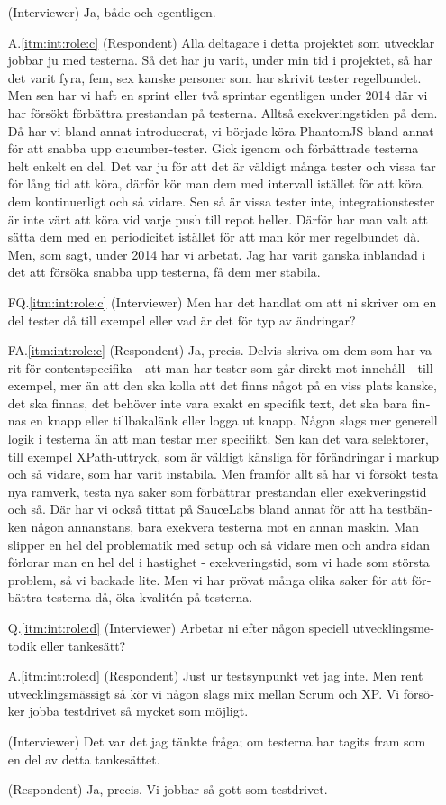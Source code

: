 \begin{otherlanguage}{swedish}
\begin{itemize}
  \item[] (Interviewer) Ja, både och egentligen.
  \item[A.\ref{itm:int:role:c}] (Respondent) Alla deltagare i detta projektet som utvecklar jobbar ju med testerna. Så det har ju varit, under min tid i projektet, så har det varit fyra, fem, sex kanske personer som har skrivit tester regelbundet. Men sen har vi haft en sprint eller två sprintar egentligen under 2014 där vi har försökt förbättra prestandan på testerna. Alltså exekveringstiden på dem. Då har vi bland annat introducerat, vi började köra PhantomJS bland annat för att snabba upp cucumber-tester. Gick igenom och förbättrade testerna helt enkelt en del. Det var ju för att det är väldigt många tester och vissa tar för lång tid att köra, därför kör man dem med intervall istället för att köra dem kontinuerligt och så vidare. Sen så är vissa tester inte, integrationstester är inte värt att köra vid varje push till repot heller. Därför har man valt att sätta dem med en periodicitet istället för att man kör mer regelbundet då. Men, som sagt, under 2014 har vi arbetat. Jag har varit ganska inblandad i det att försöka snabba upp testerna, få dem mer stabila.  
  \item[FQ.\ref{itm:int:role:c}] (Interviewer) Men har det handlat om att ni skriver om en del tester då till exempel eller vad är det för typ av ändringar?
  \item[FA.\ref{itm:int:role:c}] (Respondent) Ja, precis. Delvis skriva om dem som har varit för contentspecifika - att man har tester som går direkt mot innehåll - till exempel, mer än att den ska kolla att det finns något på en viss plats kanske, det ska finnas,  det behöver inte vara exakt en specifik text, det ska bara finnas en knapp eller tillbakalänk eller logga ut knapp. Någon slags mer generell logik i testerna än att man testar mer specifikt. Sen kan det vara selektorer, till exempel XPath-uttryck, som är väldigt känsliga för förändringar i markup och så vidare, som har varit instabila. Men framför allt så har vi försökt testa nya ramverk, testa nya saker som förbättrar prestandan eller exekveringstid och så. Där har vi också tittat på SauceLabs bland annat för att ha testbänken någon annanstans, bara exekvera testerna mot en annan maskin. Man slipper en hel del problematik med setup och så vidare men och andra sidan förlorar man en hel del i hastighet - exekveringstid, som vi hade som största problem, så vi backade lite. Men vi har prövat många olika saker för att förbättra testerna då, öka kvalitén på testerna.
  \item[Q.\ref{itm:int:role:d}] (Interviewer) Arbetar ni efter någon speciell utvecklingsmetodik eller tankesätt?
  \item[A.\ref{itm:int:role:d}] (Respondent) Just ur testsynpunkt vet jag inte. Men rent utvecklingsmässigt så kör vi någon slags mix mellan Scrum och XP. Vi försöker jobba testdrivet så mycket som möjligt. 
  \item[] (Interviewer) Det var det jag tänkte fråga; om testerna har tagits fram som en del av detta tankesättet.
  \item[] (Respondent) Ja, precis. Vi jobbar så gott som testdrivet.
  

\end{itemize}
\end{otherlanguage}
